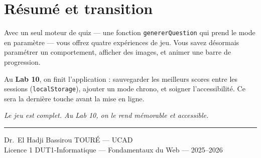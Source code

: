 \documentclass[11pt,a4paper]{article}
\newcommand{\code}[1]{\texttt{#1}}
\begin{document}
\section{Résumé et transition}

Avec un seul moteur de quiz --- une fonction \code{genererQuestion} qui prend le mode en paramètre --- vous offrez quatre expériences de jeu. Vous savez désormais paramétrer un comportement, afficher des images, et animer une barre de progression.

Au \textbf{Lab 10}, on finit l'application : sauvegarder les meilleurs scores entre les sessions (\code{localStorage}), ajouter un mode chrono, et soigner l'accessibilité. Ce sera la dernière touche avant la mise en ligne.

\begin{center}
\textit{Le jeu est complet. Au Lab 10, on le rend mémorable et accessible.}
\end{center}

\bigskip
\noindent\rule{\textwidth}{0.4pt}
\begin{center}
\small Dr.~El Hadji Bassirou TOURÉ --- UCAD\\
\small Licence 1 DUT1-Informatique --- Fondamentaux du Web --- 2025--2026
\end{center}
\end{document}
